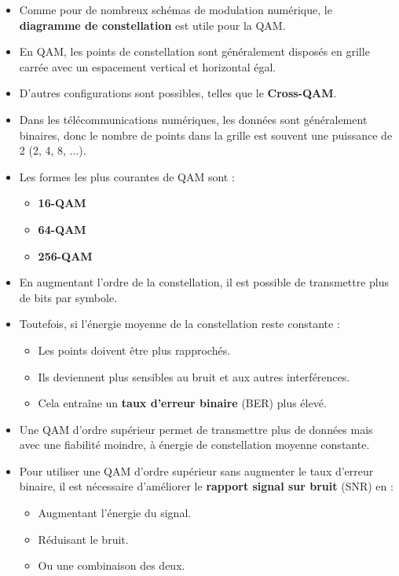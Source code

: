 \begin{itemize}
    \item Comme pour de nombreux schémas de modulation numérique, le \textbf{diagramme de constellation} est utile pour la QAM.
    \item En QAM, les points de constellation sont généralement disposés en grille carrée avec un espacement vertical et horizontal égal.
    \item D'autres configurations sont possibles, telles que le \textbf{Cross-QAM}.
    \item Dans les télécommunications numériques, les données sont généralement binaires, donc le nombre de points dans la grille est souvent une puissance de 2 (2, 4, 8, ...).
    \item Les formes les plus courantes de QAM sont :
    \begin{itemize}
        \item \textbf{16-QAM}
        \item \textbf{64-QAM}
        \item \textbf{256-QAM}
    \end{itemize}
    \item En augmentant l'ordre de la constellation, il est possible de transmettre plus de bits par symbole.
    \item Toutefois, si l'énergie moyenne de la constellation reste constante :
    \begin{itemize}
        \item Les points doivent être plus rapprochés.
        \item Ils deviennent plus sensibles au bruit et aux autres interférences.
        \item Cela entraîne un \textbf{taux d'erreur binaire} (BER) plus élevé.
    \end{itemize}
    \item Une QAM d'ordre supérieur permet de transmettre plus de données mais avec une fiabilité moindre, à énergie de constellation moyenne constante.
    \item Pour utiliser une QAM d'ordre supérieur sans augmenter le taux d'erreur binaire, il est nécessaire d'améliorer le \textbf{rapport signal sur bruit} (SNR) en :
    \begin{itemize}
        \item Augmentant l'énergie du signal.
        \item Réduisant le bruit.
        \item Ou une combinaison des deux.
    \end{itemize}
\end{itemize}

